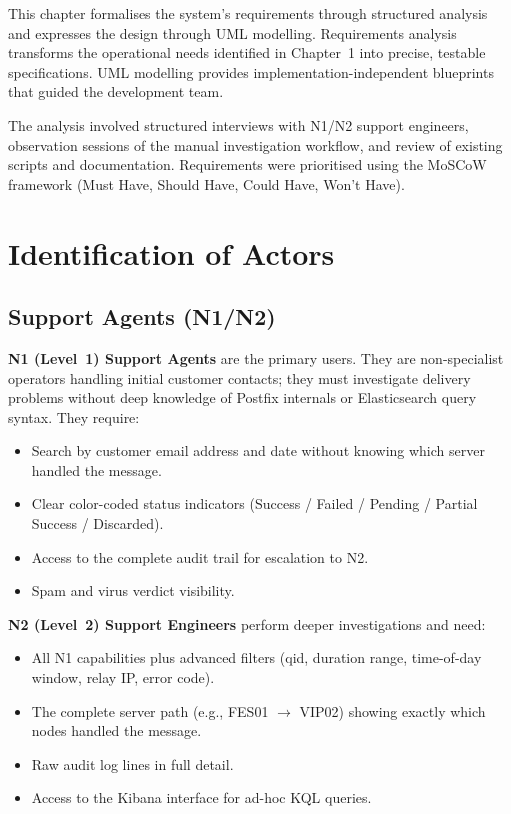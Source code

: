 \documentclass[12pt,a4paper,oneside]{report}
\begin{document}
This chapter formalises the system's requirements through structured analysis and expresses the design through UML modelling.
Requirements analysis transforms the operational needs identified in Chapter~1 into precise, testable specifications.
UML modelling provides implementation-independent blueprints that guided the development team.

The analysis involved structured interviews with N1/N2 support engineers, observation sessions of the manual investigation workflow, and review of existing scripts and documentation.
Requirements were prioritised using the MoSCoW framework (Must Have, Should Have, Could Have, Won't Have).

\section{Identification of Actors}

\subsection{Support Agents (N1/N2)}

\textbf{N1 (Level~1) Support Agents} are the primary users.
They are non-specialist operators handling initial customer contacts; they must investigate delivery problems without deep knowledge of Postfix internals or Elasticsearch query syntax.
They require:
\begin{itemize}
  \item Search by customer email address and date without knowing which server handled the message.
  \item Clear color-coded status indicators (Success / Failed / Pending / Partial Success / Discarded).
  \item Access to the complete audit trail for escalation to N2.
  \item Spam and virus verdict visibility.
\end{itemize}

\textbf{N2 (Level~2) Support Engineers} perform deeper investigations and need:
\begin{itemize}
  \item All N1 capabilities plus advanced filters (qid, duration range, time-of-day window, relay IP, error code).
  \item The complete server path (e.g., FES01 $\rightarrow$ VIP02) showing exactly which nodes handled the message.
  \item Raw audit log lines in full detail.
  \item Access to the Kibana interface for ad-hoc KQL queries.
\end{itemize}
\end{document}
